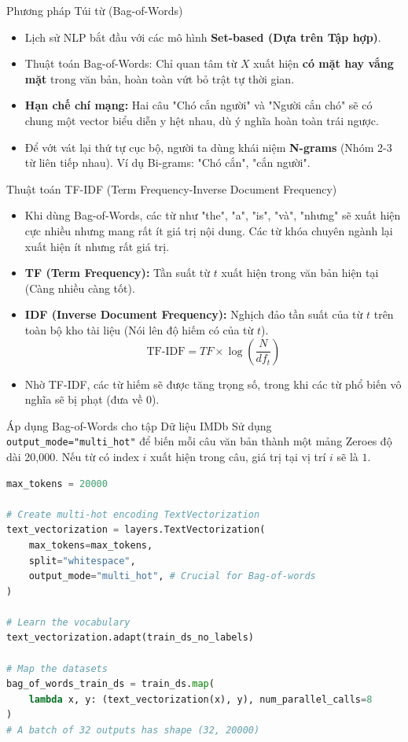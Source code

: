\documentclass[aspectratio=169]{beamer}
\begin{document}
\begin{frame}{Phương pháp Túi từ (Bag-of-Words)}
    \begin{itemize}
        \item Lịch sử NLP bắt đầu với các mô hình \textbf{Set-based (Dựa trên Tập hợp)}.
        \item Thuật toán Bag-of-Words: Chỉ quan tâm từ $X$ xuất hiện \textbf{có mặt hay vắng mặt} trong văn bản, hoàn toàn vứt bỏ trật tự thời gian.
        \item \textbf{Hạn chế chí mạng:} Hai câu "Chó cắn người" và "Người cắn chó" sẽ có chung một vector biểu diễn y hệt nhau, dù ý nghĩa hoàn toàn trái ngược.
        \item Để vớt vát lại thứ tự cục bộ, người ta dùng khái niệm \textbf{N-grams} (Nhóm 2-3 từ liên tiếp nhau). Ví dụ Bi-grams: "Chó cắn", "cắn người".
    \end{itemize}
\end{frame}

\begin{frame}{Thuật toán TF-IDF (Term Frequency-Inverse Document Frequency)}
    \begin{itemize}
        \item Khi dùng Bag-of-Words, các từ như "the", "a", "is", "và", "nhưng" sẽ xuất hiện cực nhiều nhưng mang rất ít giá trị nội dung. Các từ khóa chuyên ngành lại xuất hiện ít nhưng rất giá trị.
        \item \textbf{TF (Term Frequency):} Tần suất từ $t$ xuất hiện trong văn bản hiện tại (Càng nhiều càng tốt).
        \item \textbf{IDF (Inverse Document Frequency):} Nghịch đảo tần suất của từ $t$ trên toàn bộ kho tài liệu (Nói lên độ hiếm có của từ $t$).
        $$ \text{TF-IDF} = TF \times \log\left(\frac{N}{df_t}\right) $$
        \item Nhờ TF-IDF, các từ hiếm sẽ được tăng trọng số, trong khi các từ phổ biến vô nghĩa sẽ bị phạt (đưa về $0$).
    \end{itemize}
\end{frame}

\begin{frame}[fragile]{Áp dụng Bag-of-Words cho tập Dữ liệu IMDb}
Sử dụng \texttt{output\_mode="multi\_hot"} để biến mỗi câu văn bản thành một mảng Zeroes độ dài 20,000. Nếu từ có index $i$ xuất hiện trong câu, giá trị tại vị trí $i$ sẽ là $1$.
\begin{lstlisting}[language=Python]
max_tokens = 20000

# Create multi-hot encoding TextVectorization
text_vectorization = layers.TextVectorization(
    max_tokens=max_tokens,
    split="whitespace",
    output_mode="multi_hot", # Crucial for Bag-of-words
)

# Learn the vocabulary
text_vectorization.adapt(train_ds_no_labels)

# Map the datasets
bag_of_words_train_ds = train_ds.map(
    lambda x, y: (text_vectorization(x), y), num_parallel_calls=8
)
# A batch of 32 outputs has shape (32, 20000)
\end{lstlisting}
\end{frame}
\end{document}
